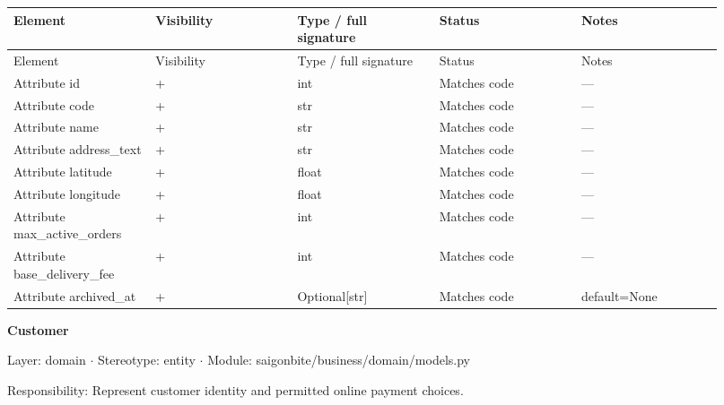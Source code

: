 \begin{longtable}{>{\raggedright\arraybackslash}p{0.1840\linewidth}>{\raggedright\arraybackslash}p{0.1840\linewidth}>{\raggedright\arraybackslash}p{0.1840\linewidth}>{\raggedright\arraybackslash}p{0.1840\linewidth}>{\raggedright\arraybackslash}p{0.1840\linewidth}}
Element & Visibility & Type / full signature & Status & Notes \\
\hline\endfirsthead
Element & Visibility & Type / full signature & Status & Notes \\
\hline\endhead
Attribute id & + & int & Matches code & --- \\
Attribute code & + & str & Matches code & --- \\
Attribute name & + & str & Matches code & --- \\
Attribute address\_text & + & str & Matches code & --- \\
Attribute latitude & + & float & Matches code & --- \\
Attribute longitude & + & float & Matches code & --- \\
Attribute max\_active\_orders & + & int & Matches code & --- \\
Attribute base\_delivery\_fee & + & int & Matches code & --- \\
Attribute archived\_at & + & Optional[str] & Matches code & default=None \\
\end{longtable}
\textbf{Customer}

Layer: domain \ensuremath{\cdot} Stereotype: \guillemotleft{}entity\guillemotright{} \ensuremath{\cdot} Module: saigonbite/business/domain/models.py

Responsibility: Represent customer identity and permitted online payment choices.

